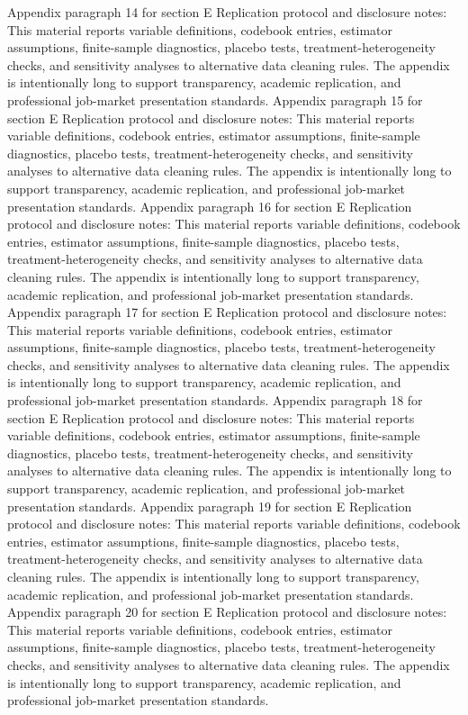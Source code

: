\documentclass[preprint,12pt]{elsarticle}
\begin{document}
Appendix paragraph 14 for section E Replication protocol and disclosure notes: This material reports variable definitions, codebook entries, estimator assumptions, finite-sample diagnostics, placebo tests, treatment-heterogeneity checks, and sensitivity analyses to alternative data cleaning rules. The appendix is intentionally long to support transparency, academic replication, and professional job-market presentation standards.
Appendix paragraph 15 for section E Replication protocol and disclosure notes: This material reports variable definitions, codebook entries, estimator assumptions, finite-sample diagnostics, placebo tests, treatment-heterogeneity checks, and sensitivity analyses to alternative data cleaning rules. The appendix is intentionally long to support transparency, academic replication, and professional job-market presentation standards.
Appendix paragraph 16 for section E Replication protocol and disclosure notes: This material reports variable definitions, codebook entries, estimator assumptions, finite-sample diagnostics, placebo tests, treatment-heterogeneity checks, and sensitivity analyses to alternative data cleaning rules. The appendix is intentionally long to support transparency, academic replication, and professional job-market presentation standards.
Appendix paragraph 17 for section E Replication protocol and disclosure notes: This material reports variable definitions, codebook entries, estimator assumptions, finite-sample diagnostics, placebo tests, treatment-heterogeneity checks, and sensitivity analyses to alternative data cleaning rules. The appendix is intentionally long to support transparency, academic replication, and professional job-market presentation standards.
Appendix paragraph 18 for section E Replication protocol and disclosure notes: This material reports variable definitions, codebook entries, estimator assumptions, finite-sample diagnostics, placebo tests, treatment-heterogeneity checks, and sensitivity analyses to alternative data cleaning rules. The appendix is intentionally long to support transparency, academic replication, and professional job-market presentation standards.
Appendix paragraph 19 for section E Replication protocol and disclosure notes: This material reports variable definitions, codebook entries, estimator assumptions, finite-sample diagnostics, placebo tests, treatment-heterogeneity checks, and sensitivity analyses to alternative data cleaning rules. The appendix is intentionally long to support transparency, academic replication, and professional job-market presentation standards.
Appendix paragraph 20 for section E Replication protocol and disclosure notes: This material reports variable definitions, codebook entries, estimator assumptions, finite-sample diagnostics, placebo tests, treatment-heterogeneity checks, and sensitivity analyses to alternative data cleaning rules. The appendix is intentionally long to support transparency, academic replication, and professional job-market presentation standards.
\end{document}
